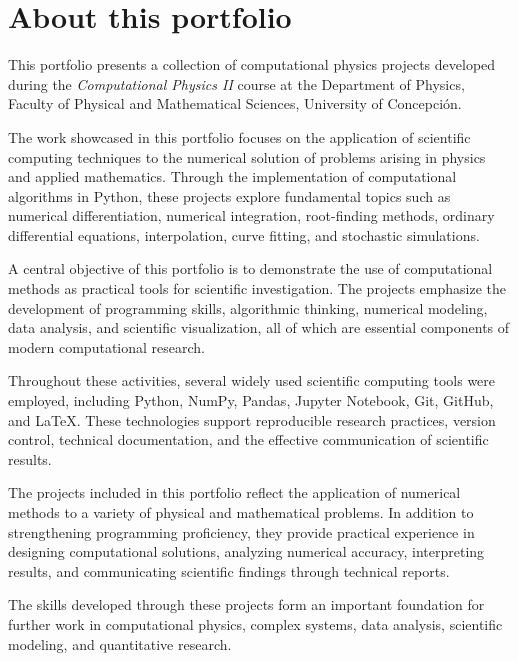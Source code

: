 \documentclass[../portafolio.tex]{subfiles}
\begin{document}
\chapter*{About this portfolio}



This portfolio presents a collection of computational physics projects developed during the \textit{Computational Physics II} course at the Department of Physics, Faculty of Physical and Mathematical Sciences, University of Concepción.

The work showcased in this portfolio focuses on the application of scientific computing techniques to the numerical solution of problems arising in physics and applied mathematics. Through the implementation of computational algorithms in Python, these projects explore fundamental topics such as numerical differentiation, numerical integration, root-finding methods, ordinary differential equations, interpolation, curve fitting, and stochastic simulations.

A central objective of this portfolio is to demonstrate the use of computational methods as practical tools for scientific investigation. The projects emphasize the development of programming skills, algorithmic thinking, numerical modeling, data analysis, and scientific visualization, all of which are essential components of modern computational research.

Throughout these activities, several widely used scientific computing tools were employed, including Python, NumPy, Pandas, Jupyter Notebook, Git, GitHub, and \LaTeX. These technologies support reproducible research practices, version control, technical documentation, and the effective communication of scientific results.

The projects included in this portfolio reflect the application of numerical methods to a variety of physical and mathematical problems. In addition to strengthening programming proficiency, they provide practical experience in designing computational solutions, analyzing numerical accuracy, interpreting results, and communicating scientific findings through technical reports.

The skills developed through these projects form an important foundation for further work in computational physics, complex systems, data analysis, scientific modeling, and quantitative research.
\end{document}

